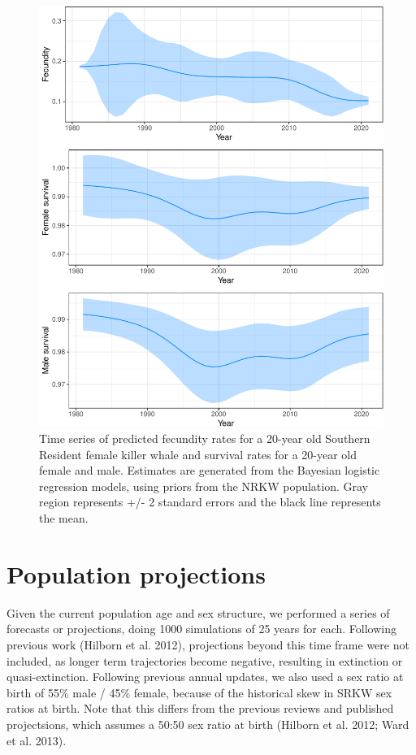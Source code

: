 \documentclass[]{article}
\begin{document}
\begin{figure}
\centering
\includegraphics{status_update_files/figure-latex/figsurvrates-1.pdf}
\caption{Time series of predicted fecundity rates for a 20-year old
Southern Resident female killer whale and survival rates for a 20-year
old female and male. Estimates are generated from the Bayesian logistic
regression models, using priors from the NRKW population. Gray region
represents +/- 2 standard errors and the black line represents the mean.
\label{fig:ts-demo}}
\end{figure}

\break

\hypertarget{population-projections}{%
\section{Population projections}\label{population-projections}}

Given the current population age and sex structure, we performed a
series of forecasts or projections, doing 1000 simulations of 25 years
for each. Following previous work (Hilborn et al. 2012), projections
beyond this time frame were not included, as longer term trajectories
become negative, resulting in extinction or quasi-extinction. Following
previous annual updates, we also used a sex ratio at birth of 55\% male
/ 45\% female, because of the historical skew in SRKW sex ratios at
birth. Note that this differs from the previous reviews and published
projectsions, which assumes a 50:50 sex ratio at birth (Hilborn et al.
2012; Ward et al. 2013).
\end{document}

